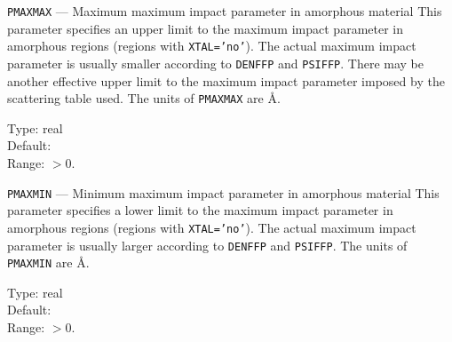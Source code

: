 \iffalse
\begin{keydescription}{\texttt{NMEHL} --- Number of abscissas in Gauss-Mehler 
    quadrature}
%
  This parameter specifies the number of abscissas in the Gauss Mehler 
  quadrature for the calculation of the scattering angle (if \texttt{LMEHL=T})
  and for the calculation of the time integral (if \texttt{E<ETIME}).
  \begin{keytab}
    Type:    \> integer \\
    Default: \> 32 \\
    Range:   \> $> 0$
  \end{keytab}
\end{keydescription}
\fi

\begin{keydescription}{\texttt{PMAXMAX} --- Maximum maximum impact
    parameter in amorphous material}
%
  This parameter specifies an upper limit to the maximum impact
  parameter in amorphous regions (regions with \texttt{XTAL='no'}).
  The actual maximum impact parameter is usually smaller according to
  {\tt DENFFP} and \texttt{PSIFFP}.  There may be another effective
  upper limit to the maximum impact parameter imposed by the
  scattering table used.  The units of \texttt{PMAXMAX} are \AA.
  \begin{keytab}
    Type:    \> real \\
    Default:  \\
    Range:   \> $>0$.
  \end{keytab}
\end{keydescription}

\begin{keydescription}{\texttt{PMAXMIN} --- Minimum maximum impact
    parameter in amorphous material}
%
  This parameter specifies a lower limit to the maximum impact
  parameter in amorphous regions (regions with \texttt{XTAL='no'}).
  The actual maximum impact parameter is usually larger according to
  {\tt DENFFP} and \texttt{PSIFFP}.  The units of \texttt{PMAXMIN} are \AA.
  \begin{keytab}
    Type:    \> real \\
    Default:  \\
    Range:   \> $>0$.
  \end{keytab}
\end{keydescription}

